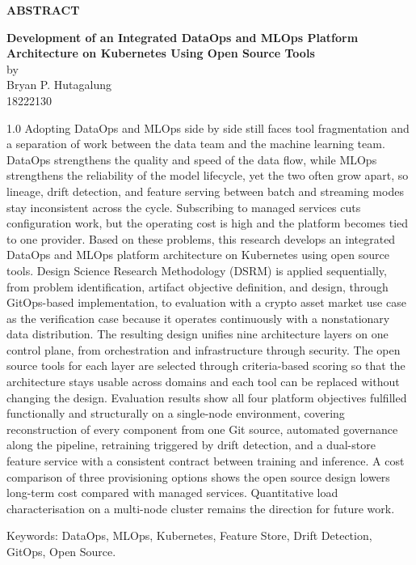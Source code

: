 \documentclass[12pt,a4paper,oneside]{book}
\begin{document}
\pagestyle{empty}

\begin{center}
    {\large\bfseries ABSTRACT}
\end{center}
\vspace{20pt}

\begin{center}
    \textbf{Development of an Integrated DataOps and MLOps Platform Architecture on Kubernetes Using Open Source Tools} \\
    \vspace{0.3cm}
    by \\
    \vspace{0.3cm}
    Bryan P. Hutagalung\\
    18222130\\
\end{center}

\begin{spacing}{1.0}
Adopting DataOps and MLOps side by side still faces tool fragmentation and a separation of work between the data team and the machine learning team. DataOps strengthens the quality and speed of the data flow, while MLOps strengthens the reliability of the model lifecycle, yet the two often grow apart, so lineage, drift detection, and feature serving between batch and streaming modes stay inconsistent across the cycle. Subscribing to managed services cuts configuration work, but the operating cost is high and the platform becomes tied to one provider. Based on these problems, this research develops an integrated DataOps and MLOps platform architecture on Kubernetes using open source tools. Design Science Research Methodology (DSRM) is applied sequentially, from problem identification, artifact objective definition, and design, through GitOps-based implementation, to evaluation with a crypto asset market use case as the verification case because it operates continuously with a nonstationary data distribution. The resulting design unifies nine architecture layers on one control plane, from orchestration and infrastructure through security. The open source tools for each layer are selected through criteria-based scoring so that the architecture stays usable across domains and each tool can be replaced without changing the design. Evaluation results show all four platform objectives fulfilled functionally and structurally on a single-node environment, covering reconstruction of every component from one Git source, automated governance along the pipeline, retraining triggered by drift detection, and a dual-store feature service with a consistent contract between training and inference. A cost comparison of three provisioning options shows the open source design lowers long-term cost compared with managed services. Quantitative load characterisation on a multi-node cluster remains the direction for future work.

Keywords: DataOps, MLOps, Kubernetes, Feature Store, Drift Detection, GitOps, Open Source.
\end{spacing}
\end{document}
